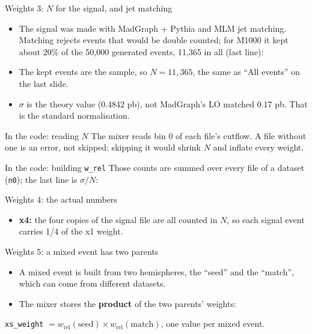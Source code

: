 \documentclass[aspectratio=169,12pt]{beamer}
\newcommand{\codesource}[1]{\par\vspace{0.2em}{\tiny\color{softgray} from #1}\par}
\newcommand{\takeaway}[1]{\vfill
  \colorbox{boxbg}{\parbox{0.96\textwidth}{\centering\vspace{0.3em}#1\vspace{0.3em}}}
  \par\vspace{0.6em}}
\begin{document}
\begin{frame}{Weights 3: $N$ for the signal, and jet matching}
  \begin{itemize}
    \item The signal was made with MadGraph + Pythia and MLM jet matching. Matching
          rejects events that would be double counted; for M1000 it kept about
          20\% of the 50{,}000 generated events, 11{,}365 in all (last line):
  \end{itemize}
  \vspace{0.3em}
  \snipgenlog
  \codesource{\srcgenlog}
  \begin{itemize}
    \item The kept events are the sample, so $N = 11{,}365$, the same as
          ``All events'' on the last slide.
    \item $\sigma$ is the theory value (0.4842 pb), not MadGraph's LO matched
          0.17 pb. That is the standard normalisation.
  \end{itemize}
\end{frame}

\begin{frame}{In the code: reading $N$}
  The mixer reads bin 0 of each file's cutflow. A file without one is an error,
  not skipped: skipping it would shrink $N$ and inflate every weight.
  \vspace{0.2em}
  {\lstset{basicstyle=\ttfamily\tiny}\snipreadn}
  \codesource{\srcreadn}
\end{frame}

\begin{frame}{In the code: building \texttt{w\_rel}}
  Those counts are summed over every file of a dataset (\texttt{n0}); the last
  line is $\sigma / N$:
  \vspace{0.2em}
  {\lstset{basicstyle=\ttfamily\tiny}\snipwrel}
  \codesource{\srcwrel}
\end{frame}

\begin{frame}{Weights 4: the actual numbers}
  \snipwtable
  \codesource{\srcwtable}
  \begin{itemize}
    \item \textbf{x4:} the four copies of the signal file are all counted in $N$,
          so each signal event carries 1/4 of the x1 weight.
  \end{itemize}
\end{frame}

\begin{frame}{Weights 5: a mixed event has two parents}
  \begin{itemize}
    \item A mixed event is built from two hemispheres, the ``seed'' and the
          ``match'', which can come from different datasets.
    \item The mixer stores the \textbf{product} of the two parents' weights:
  \end{itemize}
  \vspace{0.3em}
  \snipxsweight
  \codesource{\srcxsweight}
  \takeaway{\texttt{xs\_weight} $= w_{\text{rel}}(\text{seed}) \times
  w_{\text{rel}}(\text{match})$, one value per mixed event.}
\end{frame}
\end{document}
